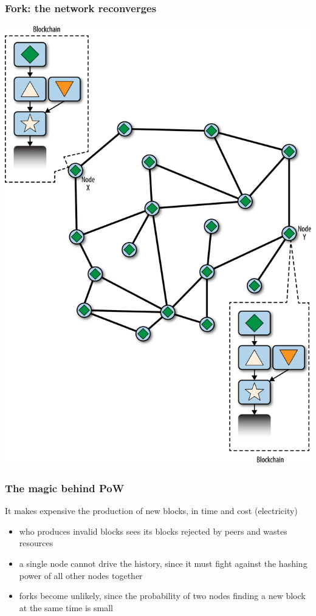 \documentclass[11pt]{beamer}  %
\begin{document}
\begin{frame}\frametitle{Fork: the network reconverges}

  \begin{center}
    \includegraphics[scale=0.47,clip=false]{pictures/mbc2_1006.png}
  \end{center}

\end{frame}

\begin{frame}\frametitle{The magic behind PoW}

  \begin{greenbox}{}
    It makes expensive the production of new blocks, in time and cost (electricity)
    \begin{itemize}
    \item who produces invalid blocks sees its blocks rejected by peers and wastes resources
    \item a single node cannot drive the history, since it must fight against
      the hashing power of all other nodes together
    \item forks become unlikely, since the probability of two nodes finding a new block at the same time
      is small
    \end{itemize}
  \end{greenbox}

\end{frame}
\end{document}

